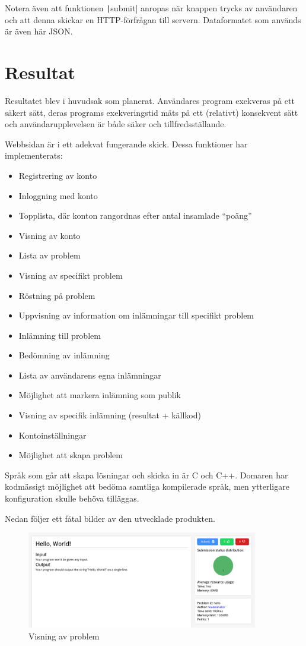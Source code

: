 \documentclass{article}
\begin{document}
Notera även att funktionen \texttt|submit| anropas när
knappen trycks av användaren och att denna skickar en HTTP-förfrågan till
servern. Dataformatet som används är även här JSON.

\section{Resultat}

Resultatet blev i huvudsak som planerat. Användares program exekveras på ett
säkert sätt, deras programs exekveringstid mäts på ett (relativt) konsekvent
sätt och användarupplevelsen är både säker och tillfredsställande.

Webbsidan är i ett adekvat fungerande skick. Dessa funktioner har
implementerats:

\begin{itemize}
	\item Registrering av konto
	\item Inloggning med konto
	\item Topplista, där konton rangordnas efter antal insamlade ``poäng''
	\item Visning av konto
	\item Lista av problem
	\item Visning av specifikt problem
	\item Röstning på problem
	\item Uppvisning av information om inlämningar till specifikt problem
	\item Inlämning till problem
	\item Bedömning av inlämning
	\item Lista av användarens egna inlämningar
	\item Möjlighet att markera inlämning som publik
	\item Visning av specifik inlämning (resultat + källkod)
	\item Kontoinställningar
	\item Möjlighet att skapa problem
\end{itemize}

Språk som går att skapa lösningar och skicka in är C och C++. Domaren har
kodmässigt möjlighet att bedöma samtliga kompilerade språk, men ytterligare
konfiguration skulle behöva tilläggas.

Nedan följer ett fåtal bilder av den utvecklade produkten.

\begin{figure}[H]
	\centering
	\includegraphics[width=0.9\textwidth]{problem}
	\caption{Visning av problem}
\end{figure}
\end{document}
